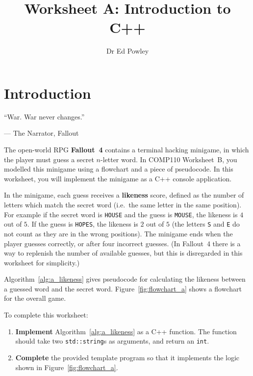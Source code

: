 \documentclass{../../fal_assignment}
\title{Worksheet A: Introduction to C++}
\author{Dr Ed Powley}
\begin{document}
\maketitle

\section*{Introduction}

\begin{marginquote}
``War. War never changes.''

--- The Narrator, Fallout
\end{marginquote}

The open-world RPG \textbf{Fallout~4} contains a terminal hacking minigame, in which
the player must guess a secret $n$-letter word.
In COMP110 Worksheet~B, you modelled this minigame using a flowchart and a piece of pseudocode.
In this worksheet, you will implement the minigame as a C++ console application.

In the minigame, each guess receives a \textbf{likeness} score,
defined as the number of letters which match the secret word (i.e.\ the same letter in the same position).
For example if the secret word is \texttt{HOUSE} and the guess is \texttt{MOUSE}, the likeness is $4$ out of $5$.
If the guess is \texttt{HOPES}, the likeness is $2$ out of $5$
(the letters \texttt{S} and \texttt{E} do not count as they are in the wrong positions).
The minigame ends when the player guesses correctly, or after four incorrect guesses.
(In Fallout~4 there is a way to replenish the number of available guesses,
but this is disregarded in this worksheet for simplicity.)

Algorithm~\ref{alg:a_likeness} gives pseudocode for calculating the likeness between a guessed word and the secret word.
Figure~\ref{fig:flowchart_a} shows a flowchart for the overall game.

To complete this worksheet:
\begin{enumerate}[label=(\alph*)]
	\item \textbf{Implement} Algorithm~\ref{alg:a_likeness} as a C++ function.
		The function should take two \lstinline{std::string}s as arguments, and return an \lstinline{int}.
	\item \textbf{Complete} the provided template program so that it implements the logic
		shown in Figure~\ref{fig:flowchart_a}.
\end{enumerate}
\end{document}
